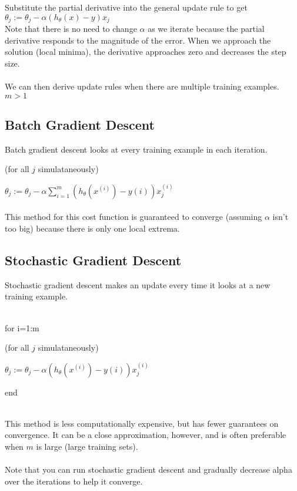 \documentclass{article}
\begin{document}
Substitute the partial derivative into the general update rule to get\\

$\theta_j := \theta_j - \alpha (h_\theta(x) - y)x_j$ \\

Note that there is no need to change $\alpha$ as we iterate because the partial derivative responds to the magnitude of the error. When we approach the solution (local minima), the derivative approaches zero and decreases the step size.\\
\\
We can then derive update rules when there are multiple training examples. $m > 1$\\

\subsection{Batch Gradient Descent}
Batch gradient descent looks at every training example in each iteration.\\
\begin{flushright}(for all $j$ simulataneously)\end{flushright}
$\theta_j := \theta_j - \alpha \sum_{i=1}^m (h_\theta(x^{(i)}) - y{(i)})x_j^{(i)}$\\
\\
This method for this cost function is guaranteed to converge (assuming $\alpha$ isn't too big) because there is only one local extrema.\\

\subsection{Stochastic Gradient Descent}
Stochastic gradient descent makes an update every time it looks at a new training example.\\
\\
\begin{samepage}
for i=1:m
\begin{flushright}(for all $j$ simulataneously)\end{flushright}
\begin{center}
$\theta_j := \theta_j - \alpha (h_\theta(x^{(i)}) - y{(i)})x_j^{(i)}$\end{center}
end\\
\end{samepage}
\\
This method is less computationally expensive, but has fewer guarantees on convergence. It can be a close approximation, however, and is often preferable when $m$ is large (large training sets).\\
\\
Note that you can run stochastic gradient descent and gradually decrease alpha over the iterations to help it converge.
\end{document}
